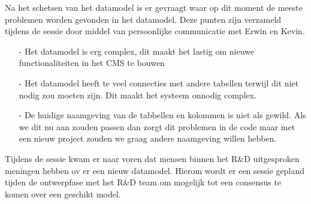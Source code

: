 \whitespace[2]
Na het schetsen van het datamodel is er gevraagt waar op dit moment de meeste problemen worden gevonden in het datamodel.
Deze punten zijn verzameld tijdens de sessie door middel van persoonlijke communicatie met Erwin en Kevin.
\begin{itemize}
    \item[-]{Het datamodel is erg complex, dit maakt het lastig om nieuwe functionaliteiten in het CMS te bouwen}
    \item[-]{Het datamodel heeft te veel connecties met andere tabellen terwijl dit niet nodig zou moeten zijn.
        Dit maakt het systeem onnodig complex.}
    \item[-]{De huidige naamgeving van de tabbellen en kolommen is niet als gewild.
        Als we dit nu aan zouden passen dan zorgt dit problemen in de code maar met een nieuw project zouden we graag andere naamgeving willen hebben.}
\end{itemize}

\whitespace
Tijdens de sessie kwam er naar voren dat mensen binnen het R\&D uitgesproken meningen hebben ov er een nieuw datamodel.
Hierom wordt er een sessie gepland tijden de ontwerpfase met het R\&D team om mogelijk tot een consensus te komen over een geschikt model.
%
%
%
%
